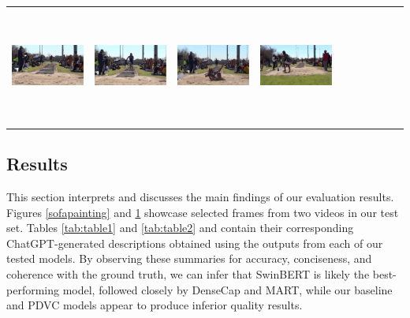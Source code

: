 \begin{table}[h]
{\begin{tabular}{cccccccccc}
      \includegraphics[width=2in, height=1.5in]{images/BCRpdf/frame6.pdf} &
      \includegraphics[width=2in, height=1.5in]{images/BCRpdf/frame7.pdf}  &
      \includegraphics[width=2in, height=1.5in]{images/BCRpdf/frame8.pdf} &
      \includegraphics[width=2in, height=1.5in]{images/BCRpdf/frame9.pdf}  \\
    \end{tabular}%
  }
    \label{longjump}
\end{table}

\subsection{Results}
This section interprets and discusses the main findings of our evaluation results. Figures \ref{sofapainting} and \ref{longjump} showcase selected frames from two videos in our test set. Tables \ref{tab:table1} and \ref{tab:table2} and contain their corresponding ChatGPT-generated descriptions obtained using the outputs from each of our tested models. By observing these summaries for accuracy, conciseness, and coherence with the ground truth, we can infer that SwinBERT is likely the best-performing model, followed closely by DenseCap and MART, while our baseline and PDVC models appear to produce inferior quality results.

